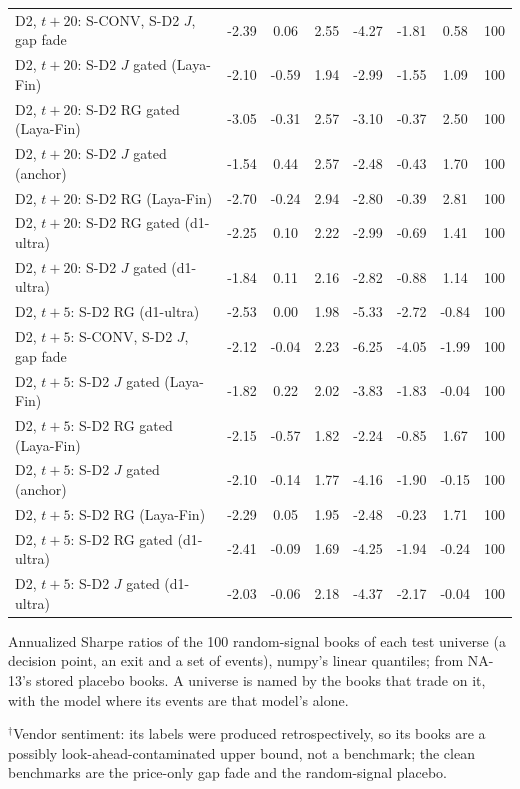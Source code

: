 \begin{longtable}{@{}>{\raggedright\arraybackslash}p{2.3in}S[table-format=-1.2]S[table-format=-1.2]S[table-format=1.2]S[table-format=-2.2]S[table-format=-2.2]S[table-format=-1.2]S[table-format=3.0]@{}}
D2, $t{+}20$: S-CONV, S-D2 $J$, gap fade & -2.39 & 0.06 & 2.55 & -4.27 & -1.81 & 0.58 & 100 \\
D2, $t{+}20$: S-D2 $J$ gated (Laya-Fin) & -2.10 & -0.59 & 1.94 & -2.99 & -1.55 & 1.09 & 100 \\
D2, $t{+}20$: S-D2 RG gated (Laya-Fin) & -3.05 & -0.31 & 2.57 & -3.10 & -0.37 & 2.50 & 100 \\
D2, $t{+}20$: S-D2 $J$ gated (anchor) & -1.54 & 0.44 & 2.57 & -2.48 & -0.43 & 1.70 & 100 \\
D2, $t{+}20$: S-D2 RG (Laya-Fin) & -2.70 & -0.24 & 2.94 & -2.80 & -0.39 & 2.81 & 100 \\
D2, $t{+}20$: S-D2 RG gated (d1-ultra) & -2.25 & 0.10 & 2.22 & -2.99 & -0.69 & 1.41 & 100 \\
D2, $t{+}20$: S-D2 $J$ gated (d1-ultra) & -1.84 & 0.11 & 2.16 & -2.82 & -0.88 & 1.14 & 100 \\
D2, $t{+}5$: S-D2 RG (d1-ultra) & -2.53 & 0.00 & 1.98 & -5.33 & -2.72 & -0.84 & 100 \\
D2, $t{+}5$: S-CONV, S-D2 $J$, gap fade & -2.12 & -0.04 & 2.23 & -6.25 & -4.05 & -1.99 & 100 \\
D2, $t{+}5$: S-D2 $J$ gated (Laya-Fin) & -1.82 & 0.22 & 2.02 & -3.83 & -1.83 & -0.04 & 100 \\
D2, $t{+}5$: S-D2 RG gated (Laya-Fin) & -2.15 & -0.57 & 1.82 & -2.24 & -0.85 & 1.67 & 100 \\
D2, $t{+}5$: S-D2 $J$ gated (anchor) & -2.10 & -0.14 & 1.77 & -4.16 & -1.90 & -0.15 & 100 \\
D2, $t{+}5$: S-D2 RG (Laya-Fin) & -2.29 & 0.05 & 1.95 & -2.48 & -0.23 & 1.71 & 100 \\
D2, $t{+}5$: S-D2 RG gated (d1-ultra) & -2.41 & -0.09 & 1.69 & -4.25 & -1.94 & -0.24 & 100 \\
D2, $t{+}5$: S-D2 $J$ gated (d1-ultra) & -2.03 & -0.06 & 2.18 & -4.37 & -2.17 & -0.04 & 100 \\
\end{longtable}
\endgroup
\vspace{-0.5\baselineskip}
{\footnotesize\raggedright
Annualized Sharpe ratios of the 100 random-signal books of each test universe (a decision point, an exit and a set of events), numpy's linear quantiles; from NA-13's stored placebo books. A universe is named by the books that trade on it, with the model where its events are that model's alone.\par
$^{\dagger}$Vendor sentiment: its labels were produced retrospectively, so its books are a possibly look-ahead-contaminated upper bound, not a benchmark; the clean benchmarks are the price-only gap fade and the random-signal placebo.\par
}

